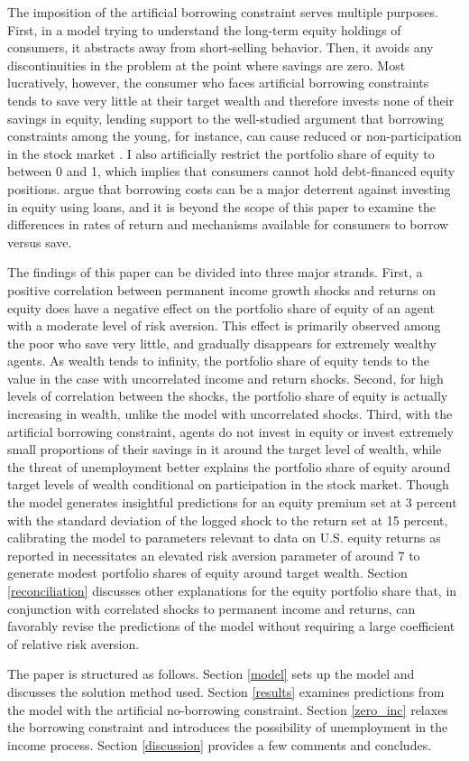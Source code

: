 The imposition of the artificial borrowing constraint serves multiple purposes. First, in a model trying to understand the long-term equity holdings of consumers, it abstracts away from short-selling behavior. Then, it avoids any discontinuities in the problem at the point where savings are zero. Most lucratively, however, the consumer who faces artificial borrowing constraints tends to save very little at their target wealth and therefore invests none of their savings in equity, lending support to the well-studied argument that borrowing constraints among the young, for instance, can cause reduced or non-participation in the stock market \citep{Constantinides2002, Haliassos1998, Kogan2007, Jang2015, Harenberg2018}. I also artificially restrict the portfolio share of equity to between 0 and 1, which implies that consumers cannot hold debt-financed equity positions. \citet{Davis2006} argue that borrowing costs can be a major deterrent against investing in equity using loans, and it is beyond the scope of this paper to examine the differences in rates of return and mechanisms available for consumers to borrow versus save.

The findings of this paper can be divided into three major strands. First, a positive correlation between permanent income growth shocks and returns on equity does have a negative effect on the portfolio share of equity of an agent with a moderate level of risk aversion. This effect is primarily observed among the poor who save very little, and gradually disappears for extremely wealthy agents. As wealth tends to infinity, the portfolio share of equity tends to the value in the case with uncorrelated income and return shocks. Second, for high levels of correlation between the shocks, the portfolio share of equity is actually increasing in wealth, unlike the model with uncorrelated shocks. Third, with the artificial borrowing constraint, agents do not invest in equity or invest extremely small proportions of their savings in it around the target level of wealth, while the threat of unemployment better explains the portfolio share of equity around target levels of wealth conditional on participation in the stock market. Though the model generates insightful predictions for an equity premium set at 3 percent with the standard deviation of the logged shock to the return set at 15 percent, calibrating the model to parameters relevant to data on U.S. equity returns as reported in \citet{Mehra2006} necessitates an elevated risk aversion parameter of around 7 to generate modest portfolio shares of equity around target wealth. Section \ref{reconciliation} discusses other explanations for the equity portfolio share that, in conjunction with correlated shocks to permanent income and returns, can favorably revise the predictions of the model without requiring a large coefficient of relative risk aversion.

The paper is structured as follows. Section \ref{model} sets up the model and discusses the solution method used. Section \ref{results} examines predictions from the model with the artificial no-borrowing constraint. Section \ref{zero_inc} relaxes the borrowing constraint and introduces the possibility of unemployment in the income process. Section \ref{discussion} provides a few comments and concludes.